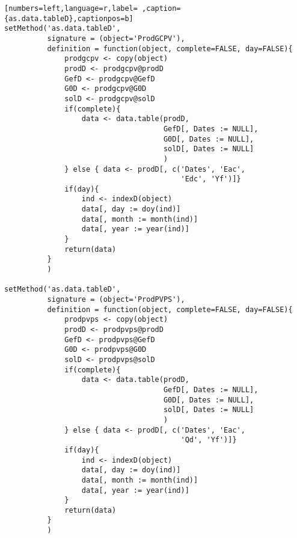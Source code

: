 \begin{lstlisting}[numbers=left,language=r,label= ,caption={as.data.tableD},captionpos=b]
setMethod('as.data.tableD',
          signature = (object='ProdGCPV'),
          definition = function(object, complete=FALSE, day=FALSE){
              prodgcpv <- copy(object)
              prodD <- prodgcpv@prodD
              GefD <- prodgcpv@GefD
              G0D <- prodgcpv@G0D
              solD <- prodgcpv@solD
              if(complete){
                  data <- data.table(prodD,
                                     GefD[, Dates := NULL],
                                     G0D[, Dates := NULL],
                                     solD[, Dates := NULL]
                                     )
              } else { data <- prodD[, c('Dates', 'Eac',
                                         'Edc', 'Yf')]}
              if(day){
                  ind <- indexD(object)
                  data[, day := doy(ind)]
                  data[, month := month(ind)]
                  data[, year := year(ind)]
              }
              return(data)
          }
          )

setMethod('as.data.tableD',
          signature = (object='ProdPVPS'),
          definition = function(object, complete=FALSE, day=FALSE){
              prodpvps <- copy(object)
              prodD <- prodpvps@prodD
              GefD <- prodpvps@GefD
              G0D <- prodpvps@G0D
              solD <- prodpvps@solD
              if(complete){
                  data <- data.table(prodD,
                                     GefD[, Dates := NULL],
                                     G0D[, Dates := NULL],
                                     solD[, Dates := NULL]
                                     )
              } else { data <- prodD[, c('Dates', 'Eac',
                                         'Qd', 'Yf')]}
              if(day){
                  ind <- indexD(object)
                  data[, day := doy(ind)]
                  data[, month := month(ind)]
                  data[, year := year(ind)]
              }
              return(data)
          }
          )
\end{lstlisting}
